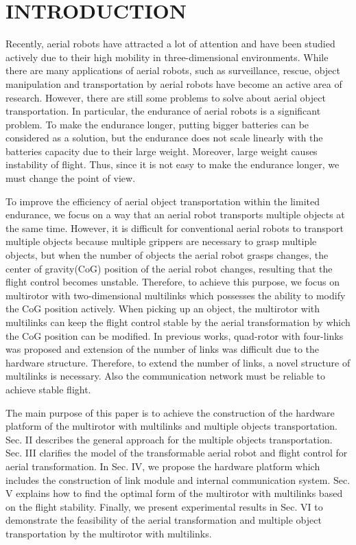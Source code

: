 \section{INTRODUCTION}
Recently, aerial robots have attracted a lot of attention and have been studied actively due to their high mobility in three-dimensional environments\cite{Kumar2012}. While there are many applications of aerial robots, such as surveillance\cite{surveillance}, rescue\cite{rescue}, object manipulation and transportation by aerial robots have become an active area of research\cite{lindsey2012}\cite{Mellinger2011}\cite{ZhaoISER2016}\cite{ZhaoICRA2017}\cite{Bernard2009}\cite{Hugh2012}. However, there are still some problems to solve about aerial object transportation. In particular, the endurance of aerial robots is a significant problem. To make the endurance longer, putting bigger batteries can be considered as a solution, but the endurance does not scale linearly with the batteries capacity due to their large weight. Moreover, large weight causes instability of flight. Thus, since it is not easy to make the endurance longer, we must change the point of view. 
\par
To improve the efficiency of aerial object transportation within the limited endurance, we focus on a way that an aerial robot transports multiple objects at the same time. However, it is difficult for conventional aerial robots to transport multiple objects because multiple grippers are necessary to grasp multiple objects, but when the number of objects the aerial robot grasps changes, the center of gravity(CoG) position of the aerial robot changes, resulting that the flight control becomes unstable. Therefore, to achieve this purpose, we focus on multirotor with two-dimensional multilinks\cite{Zhao2016} which possesses the ability to modify the CoG position actively. When picking up an object, the multirotor with multilinks can keep the flight control stable by the aerial transformation by which the CoG position can be modified. In previous works\cite{ZhaoISER2016}\cite{ZhaoICRA2017}\cite{Zhao2016}, quad-rotor with four-links was proposed and extension of the number of links was difficult due to the hardware structure. Therefore, to extend the number of links, a novel structure of multilinks is necessary. Also the communication network must be reliable to achieve stable flight.
\par
The main purpose of this paper is to achieve the construction of the hardware platform of the multirotor with multilinks and multiple objects transportation. Sec. II describes the general approach for the multiple objects transportation. Sec. III clarifies the model of the transformable aerial robot and flight control for aerial transformation. In Sec. IV, we propose the hardware platform which includes the construction of link module and internal communication system. Sec. V explains how to find the optimal form of the multirotor with multilinks based on the flight stability. Finally, we present experimental results in Sec. VI to demonstrate the feasibility of the aerial transformation and multiple object transportation by the multirotor with multilinks. 
